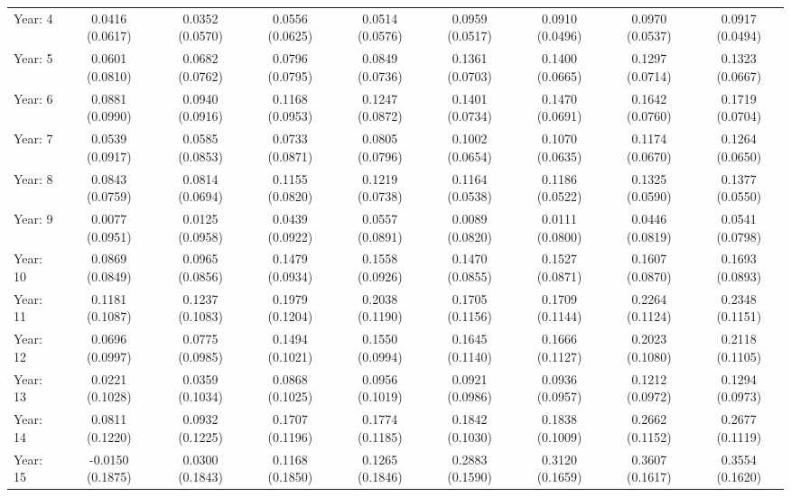 \begin{tabular}{lcccccccc}
   Year: 4                             & 0.0416 (0.0617)  & 0.0352 (0.0570)  & 0.0556 (0.0625)  & 0.0514 (0.0576)  & 0.0959 (0.0517)  & 0.0910 (0.0496)  & 0.0970 (0.0537)  & 0.0917 (0.0494)\\   
   Year: 5                             & 0.0601 (0.0810)  & 0.0682 (0.0762)  & 0.0796 (0.0795)  & 0.0849 (0.0736)  & 0.1361 (0.0703)  & 0.1400 (0.0665)  & 0.1297 (0.0714)  & 0.1323 (0.0667)\\   
   Year: 6                             & 0.0881 (0.0990)  & 0.0940 (0.0916)  & 0.1168 (0.0953)  & 0.1247 (0.0872)  & 0.1401 (0.0734)  & 0.1470 (0.0691)  & 0.1642 (0.0760)  & 0.1719 (0.0704)\\   
   Year: 7                             & 0.0539 (0.0917)  & 0.0585 (0.0853)  & 0.0733 (0.0871)  & 0.0805 (0.0796)  & 0.1002 (0.0654)  & 0.1070 (0.0635)  & 0.1174 (0.0670)  & 0.1264 (0.0650)\\   
   Year: 8                             & 0.0843 (0.0759)  & 0.0814 (0.0694)  & 0.1155 (0.0820)  & 0.1219 (0.0738)  & 0.1164 (0.0538)  & 0.1186 (0.0522)  & 0.1325 (0.0590)  & 0.1377 (0.0550)\\   
   Year: 9                             & 0.0077 (0.0951)  & 0.0125 (0.0958)  & 0.0439 (0.0922)  & 0.0557 (0.0891)  & 0.0089 (0.0820)  & 0.0111 (0.0800)  & 0.0446 (0.0819)  & 0.0541 (0.0798)\\   
   Year: 10                            & 0.0869 (0.0849)  & 0.0965 (0.0856)  & 0.1479 (0.0934)  & 0.1558 (0.0926)  & 0.1470 (0.0855)  & 0.1527 (0.0871)  & 0.1607 (0.0870)  & 0.1693 (0.0893)\\   
   Year: 11                            & 0.1181 (0.1087)  & 0.1237 (0.1083)  & 0.1979 (0.1204)  & 0.2038 (0.1190)  & 0.1705 (0.1156)  & 0.1709 (0.1144)  & 0.2264 (0.1124)  & 0.2348 (0.1151)\\   
   Year: 12                            & 0.0696 (0.0997)  & 0.0775 (0.0985)  & 0.1494 (0.1021)  & 0.1550 (0.0994)  & 0.1645 (0.1140)  & 0.1666 (0.1127)  & 0.2023 (0.1080)  & 0.2118 (0.1105)\\   
   Year: 13                            & 0.0221 (0.1028)  & 0.0359 (0.1034)  & 0.0868 (0.1025)  & 0.0956 (0.1019)  & 0.0921 (0.0986)  & 0.0936 (0.0957)  & 0.1212 (0.0972)  & 0.1294 (0.0973)\\   
   Year: 14                            & 0.0811 (0.1220)  & 0.0932 (0.1225)  & 0.1707 (0.1196)  & 0.1774 (0.1185)  & 0.1842 (0.1030)  & 0.1838 (0.1009)  & 0.2662 (0.1152)  & 0.2677 (0.1119)\\   
   Year: 15                            & -0.0150 (0.1875) & 0.0300 (0.1843)  & 0.1168 (0.1850)  & 0.1265 (0.1846)  & 0.2883 (0.1590)  & 0.3120 (0.1659)  & 0.3607 (0.1617)  & 0.3554 (0.1620)\\   

\end{tabular}
